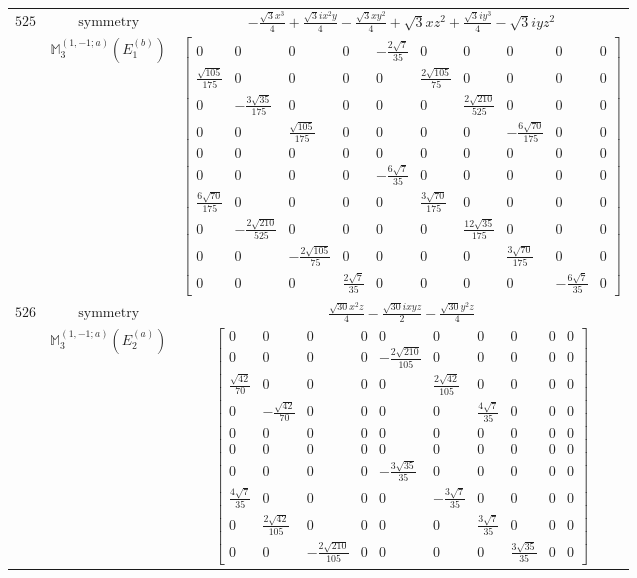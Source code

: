\documentclass[fleqn,8pt,landscape]{jsarticle}
\begin{document}
\begin{longtable}{ccc}
$ 525 $ & $ \text{symmetry} $ & $ - \frac{\sqrt{3} x^{3}}{4} + \frac{\sqrt{3} i x^{2} y}{4} - \frac{\sqrt{3} x y^{2}}{4} + \sqrt{3} x z^{2} + \frac{\sqrt{3} i y^{3}}{4} - \sqrt{3} i y z^{2} $ \\
$  $ & $ \mathbb{M}_{3}^{(1,-1;a)}(E_{1}^{(b)}) $ & $ \begin{bmatrix} 0 & 0 & 0 & 0 & - \frac{2 \sqrt{7}}{35} & 0 & 0 & 0 & 0 & 0 \\ \frac{\sqrt{105}}{175} & 0 & 0 & 0 & 0 & \frac{2 \sqrt{105}}{75} & 0 & 0 & 0 & 0 \\ 0 & - \frac{3 \sqrt{35}}{175} & 0 & 0 & 0 & 0 & \frac{2 \sqrt{210}}{525} & 0 & 0 & 0 \\ 0 & 0 & \frac{\sqrt{105}}{175} & 0 & 0 & 0 & 0 & - \frac{6 \sqrt{70}}{175} & 0 & 0 \\ 0 & 0 & 0 & 0 & 0 & 0 & 0 & 0 & 0 & 0 \\ 0 & 0 & 0 & 0 & - \frac{6 \sqrt{7}}{35} & 0 & 0 & 0 & 0 & 0 \\ \frac{6 \sqrt{70}}{175} & 0 & 0 & 0 & 0 & \frac{3 \sqrt{70}}{175} & 0 & 0 & 0 & 0 \\ 0 & - \frac{2 \sqrt{210}}{525} & 0 & 0 & 0 & 0 & \frac{12 \sqrt{35}}{175} & 0 & 0 & 0 \\ 0 & 0 & - \frac{2 \sqrt{105}}{75} & 0 & 0 & 0 & 0 & \frac{3 \sqrt{70}}{175} & 0 & 0 \\ 0 & 0 & 0 & \frac{2 \sqrt{7}}{35} & 0 & 0 & 0 & 0 & - \frac{6 \sqrt{7}}{35} & 0 \end{bmatrix} $ \\ \hline
$ 526 $ & $ \text{symmetry} $ & $ \frac{\sqrt{30} x^{2} z}{4} - \frac{\sqrt{30} i x y z}{2} - \frac{\sqrt{30} y^{2} z}{4} $ \\
$  $ & $ \mathbb{M}_{3}^{(1,-1;a)}(E_{2}^{(a)}) $ & $ \begin{bmatrix} 0 & 0 & 0 & 0 & 0 & 0 & 0 & 0 & 0 & 0 \\ 0 & 0 & 0 & 0 & - \frac{2 \sqrt{210}}{105} & 0 & 0 & 0 & 0 & 0 \\ \frac{\sqrt{42}}{70} & 0 & 0 & 0 & 0 & \frac{2 \sqrt{42}}{105} & 0 & 0 & 0 & 0 \\ 0 & - \frac{\sqrt{42}}{70} & 0 & 0 & 0 & 0 & \frac{4 \sqrt{7}}{35} & 0 & 0 & 0 \\ 0 & 0 & 0 & 0 & 0 & 0 & 0 & 0 & 0 & 0 \\ 0 & 0 & 0 & 0 & 0 & 0 & 0 & 0 & 0 & 0 \\ 0 & 0 & 0 & 0 & - \frac{3 \sqrt{35}}{35} & 0 & 0 & 0 & 0 & 0 \\ \frac{4 \sqrt{7}}{35} & 0 & 0 & 0 & 0 & - \frac{3 \sqrt{7}}{35} & 0 & 0 & 0 & 0 \\ 0 & \frac{2 \sqrt{42}}{105} & 0 & 0 & 0 & 0 & \frac{3 \sqrt{7}}{35} & 0 & 0 & 0 \\ 0 & 0 & - \frac{2 \sqrt{210}}{105} & 0 & 0 & 0 & 0 & \frac{3 \sqrt{35}}{35} & 0 & 0 \end{bmatrix} $ \\ \hline

\end{longtable}
\end{document}
